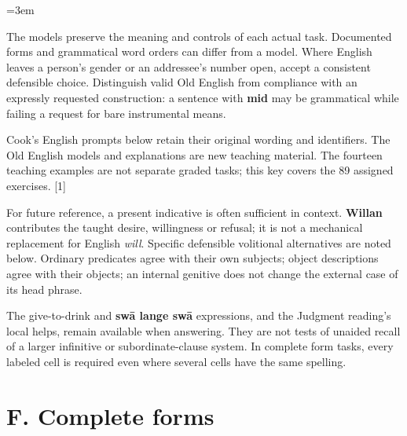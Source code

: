 \BookRecto
\begingroup
\renewcommand{\runningtitle}{Unit 10. Answer key}
\emergencystretch=3em
\newcommand{\itempara}[2]{\par\addvspace{3pt}\noindent\hangindent=1.8em\hangafter=1\makebox[1.8em][l]{#1.}#2\par}
\newcommand{\reserve}[1]{\par\penalty-100\begingroup\dimen0=\pagegoal\advance\dimen0 by-\pagetotal\ifdim\dimen0<#1\newpage\fi\endgroup}

\raggedright
{}

The models preserve the meaning and controls of each actual task. Documented forms and grammatical word orders can differ from a model. Where English leaves a person's gender or an addressee's number open, accept a consistent defensible choice. Distinguish valid Old English from compliance with an expressly requested construction: a sentence with \textbf{mid} may be grammatical while failing a request for bare instrumental means.

Cook's English prompts below retain their original wording and identifiers. The Old English models and explanations are new teaching material. The fourteen teaching examples are not separate graded tasks; this key covers the 89 assigned exercises. [1]

For future reference, a present indicative is often sufficient in context. \textbf{Willan} contributes the taught desire, willingness or refusal; it is not a mechanical replacement for English \emph{will}. Specific defensible volitional alternatives are noted below. Ordinary predicates agree with their own subjects; object descriptions agree with their objects; an internal genitive does not change the external case of its head phrase.

The give-to-drink and \textbf{swā lange swā} expressions, and the Judgment reading's local helps, remain available when answering. They are not tests of unaided recall of a larger infinitive or subordinate-clause system. In complete form tasks, every labeled cell is required even where several cells have the same spelling.

\clearpage
\section*{F. Complete forms}

